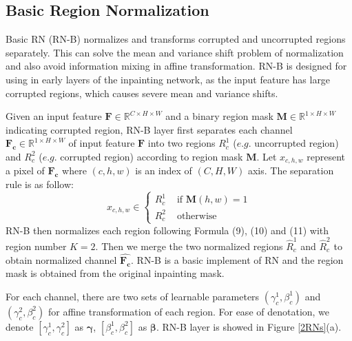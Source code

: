 \documentclass[letterpaper]{article} %
\begin{document}
\subsection{Basic Region Normalization} 
Basic RN (RN-B) normalizes and transforms corrupted and uncorrupted regions separately. This can solve the mean and variance shift problem of normalization and also avoid information mixing in affine transformation. RN-B is designed for using in early layers of the inpainting network, as the input feature has large corrupted regions, which causes severe mean and variance shifts.

Given an input feature $\bm{F} \in \mathbb{R}^{C \times H \times W}$ and a binary region mask $\bm{M} \in \mathbb{R}^{1 \times H \times W}$ indicating corrupted region, RN-B layer first separates each channel $\bm{F_c} \in \mathbb{R}^{1 \times H \times W}$ of input feature $\bm{F}$ into two regions $R_c^{1}$ ($e.g.$ uncorrupted region) and $R_c^{2}$ ($e.g.$ corrupted region) according to region mask $\bm{M}$. Let $x_{c,h,w}$ represent a pixel of $\bm{F_c}$ where $(c,h,w)$ is an index of $(C,H,W)$ axis.
The separation rule is as follow:
\begin{equation}
x_{c,h,w}\in \begin{cases}
R_c^{1} & \text{ if } \bm{M}(h,w)=1 \\ 
R_c^{2} & \text{ otherwise } 
\end{cases}
\end{equation}
RN-B then normalizes each region following Formula (9), (10) and (11) with region number $K=2$. Then we merge the two normalized regions $\hat R_c^{1}$ and $\hat R_c^{2}$ to obtain normalized channel $\bm{ \hat {F_c}}$. RN-B is a basic implement of RN and the region mask is obtained from the original inpainting mask. 

For each channel, there are two sets of learnable parameters $(\gamma_c^1, \beta_c^1)$ and $(\gamma_c^2, \beta_c^2)$ for affine transformation of each region. For ease of denotation, we denote $[\gamma_c^1, \gamma_c^2]$ as $\bm{\gamma}$, $[\beta_c^1, \beta_c^2]$ as $\bm{\beta}$. RN-B layer is showed in Figure \ref{2RNs}(a). 
\end{document}
